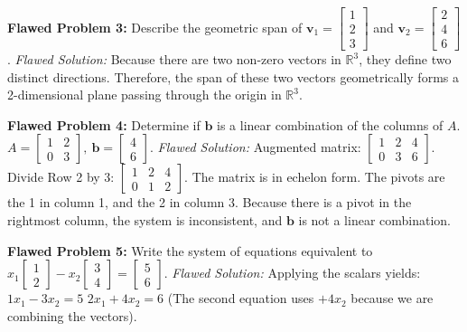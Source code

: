 \documentclass[11pt]{article}
\begin{document}
\vspace{0.3cm}
\textbf{Flawed Problem 3:} Describe the geometric span of $\mathbf{v}_1 = \begin{bmatrix} 1 \\ 2 \\ 3 \end{bmatrix}$ and $\mathbf{v}_2 = \begin{bmatrix} 2 \\ 4 \\ 6 \end{bmatrix}$.
\textit{Flawed Solution:} 
Because there are two non-zero vectors in $\mathbb{R}^3$, they define two distinct directions. Therefore, the span of these two vectors geometrically forms a 2-dimensional plane passing through the origin in $\mathbb{R}^3$.

\vspace{0.3cm}
\textbf{Flawed Problem 4:} Determine if $\mathbf{b}$ is a linear combination of the columns of $A$.
$A = \begin{bmatrix} 1 & 2 \\ 0 & 3 \end{bmatrix}, \ \mathbf{b} = \begin{bmatrix} 4 \\ 6 \end{bmatrix}$.
\textit{Flawed Solution:} 
Augmented matrix: $\begin{bmatrix} 1 & 2 & 4 \\ 0 & 3 & 6 \end{bmatrix}$.
Divide Row 2 by 3: $\begin{bmatrix} 1 & 2 & 4 \\ 0 & 1 & 2 \end{bmatrix}$.
The matrix is in echelon form. The pivots are the 1 in column 1, and the 2 in column 3. Because there is a pivot in the rightmost column, the system is inconsistent, and $\mathbf{b}$ is not a linear combination.

\vspace{0.3cm}
\textbf{Flawed Problem 5:} Write the system of equations equivalent to $x_1 \begin{bmatrix} 1 \\ 2 \end{bmatrix} - x_2 \begin{bmatrix} 3 \\ 4 \end{bmatrix} = \begin{bmatrix} 5 \\ 6 \end{bmatrix}$.
\textit{Flawed Solution:} 
Applying the scalars yields:
$1x_1 - 3x_2 = 5$
$2x_1 + 4x_2 = 6$
(The second equation uses $+4x_2$ because we are combining the vectors).
\end{document}
